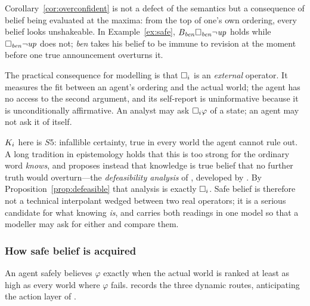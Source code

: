 \documentclass[11pt,a4paper]{article}
\begin{document}
Corollary~\ref{cor:overconfident} is not a defect of the semantics but a consequence of belief being
evaluated at the maxima: from the top of one's own ordering, every belief looks unshakeable.
In Example~\ref{ex:safe}, $B_{\mathit{ben}}\Box_{\mathit{ben}}\neg\mathit{up}$ holds while
$\Box_{\mathit{ben}}\neg\mathit{up}$ does not; \emph{ben} takes his belief to be immune to
revision at the moment before one true announcement overturns it.

The practical consequence for modelling is that $\Box_{i}$ is an \emph{external} operator. It
measures the fit between an agent's ordering and the actual world; the agent has no access to
the second argument, and its self-report is uninformative because it is unconditionally
affirmative. An analyst may ask $\Box_{i}\varphi$ of a state; an agent may not ask it of itself.

\begin{remark}
\label{rem:defeasibility}
$K_{i}$ here is $S5$: infallible certainty, true in every world the agent cannot rule out.
A long tradition in epistemology holds that this is too strong for the ordinary word
\emph{knows}, and proposes instead that knowledge is true belief that no further truth would
overturn---the \emph{defeasibility analysis} of \citet{lehrer1969}, developed by
\citet{stalnaker2006}. By Proposition~\ref{prop:defeasible} that analysis is exactly
$\Box_{i}$. Safe belief is therefore not a technical interpolant wedged between two real
operators; it is a serious candidate for what knowing \emph{is}, and \mBplus{} carries both
readings in one model so that a modeller may ask for either and compare them.
\end{remark}

\subsubsection{How safe belief is acquired}
\label{sec:acquisition}

An agent safely believes $\varphi$ exactly when the actual world is ranked at least as high as
every world where $\varphi$ fails.  records the three dynamic routes,
anticipating the action layer of .
\end{document}
